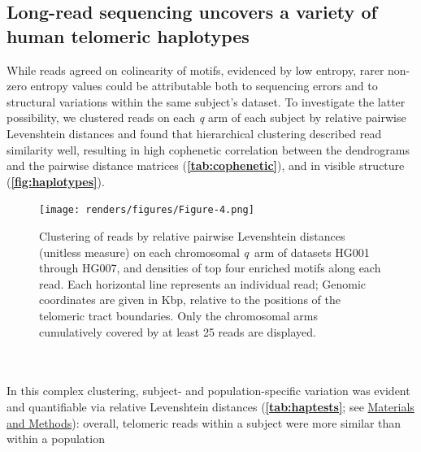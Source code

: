 \documentclass{article}
\begin{document}
\subsection*{Long-read sequencing uncovers a variety of human telomeric haplotypes}
    While reads agreed on colinearity of motifs, evidenced by low entropy,
        rarer non-zero entropy values could be attributable both to sequencing errors
        and to structural variations within the same subject's dataset.
    To investigate the latter possibility,
        we clustered reads on each \textit{q} arm of each subject by relative pairwise Levenshtein distances \cite{levenshtein}
        and found that hierarchical clustering described read similarity well,
            resulting in high cophenetic correlation between the dendrograms and the pairwise distance matrices
                (\textbf{\autoref{tab:cophenetic}}),
            and in visible structure (\textbf{\autoref{fig:haplotypes}}).
                \begin{figure}[h!] \centering %
                \texttt{[image: renders/figures/Figure-4.png]}
                \caption{
                    \small Clustering of reads by relative pairwise Levenshtein distances (unitless measure)
                    on each chromosomal \mbox{\textit{q} arm} of datasets HG001 through HG007,
                    and densities of top four enriched motifs along each read.
                    Each horizontal line represents an individual read;
                    Genomic coordinates are given in Kbp, relative to the positions of the telomeric tract boundaries.
                    Only the chromosomal arms cumulatively covered by at least 25 reads are displayed.
                }
                \label{fig:haplotypes}
                \end{figure}
    ~\\~\\
    In this complex clustering, subject- and population-specific variation was evident and quantifiable via relative Levenshtein distances
        (\textbf{\autoref{tab:haptests}}; see \hyperref[sec:methods]{Materials and Methods}):
        overall,
            telomeric reads within a subject were more similar than within a population
\end{document}
